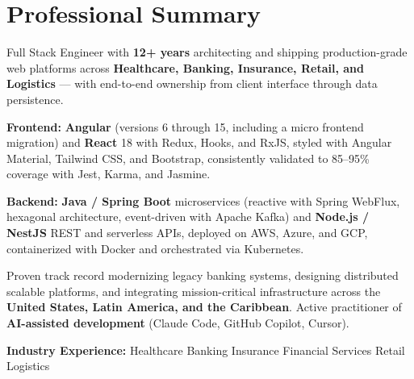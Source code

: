 
\section{Professional Summary}

{\small
Full Stack Engineer with \textbf{12+ years} architecting and shipping production-grade web
platforms across \textbf{Healthcare, Banking, Insurance, Retail, and Logistics} — with
end-to-end ownership from client interface through data persistence.

\vspace{4pt}
\textbf{Frontend:} \textbf{Angular} (versions 6 through 15, including a micro frontend
migration) and \textbf{React} 18 with Redux, Hooks, and RxJS, styled with Angular Material,
Tailwind CSS, and Bootstrap, consistently validated to 85--95\% coverage with Jest, Karma,
and Jasmine.

\vspace{4pt}
\textbf{Backend:} \textbf{Java / Spring Boot} microservices (reactive with Spring WebFlux,
hexagonal architecture, event-driven with Apache Kafka) and \textbf{Node.js / NestJS}
REST and serverless APIs, deployed on AWS, Azure, and GCP, containerized with Docker and
orchestrated via Kubernetes.

\vspace{4pt}
Proven track record modernizing legacy banking systems, designing distributed scalable
platforms, and integrating mission-critical infrastructure across the \textbf{United States,
Latin America, and the Caribbean}. Active practitioner of \textbf{AI-assisted development}
(Claude Code, GitHub Copilot, Cursor).
}

\vspace{4pt}
{\small\color{cvMuted}%
  \textbf{Industry Experience:}\enspace%
  Healthcare\enspace\textbar\enspace
  Banking\enspace\textbar\enspace
  Insurance\enspace\textbar\enspace
  Financial Services\enspace\textbar\enspace
  Retail\enspace\textbar\enspace
  Logistics%
}
